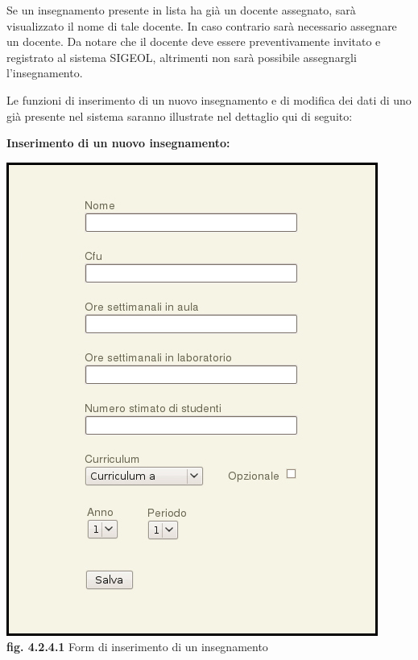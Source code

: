 \documentclass[11pt,a4paper]{article}
\begin{document}
Se un insegnamento presente in lista ha già un docente assegnato, sarà visualizzato il nome di tale docente.
In caso contrario sarà necessario assegnare un docente. Da notare che il docente deve essere preventivamente invitato e registrato al sistema SIGEOL, altrimenti non sarà possibile assegnargli l'insegnamento.

Le funzioni di inserimento di un nuovo insegnamento e di modifica dei dati di uno già presente nel sistema saranno illustrate nel dettaglio qui di seguito:
\newline \newline
\begin{large}\textbf{Inserimento di un nuovo insegnamento:}\end{large}

\bigskip
\begin{center}
	\includegraphics[scale=0.5]{images/nuovo_insegnamento.jpg}\\
	\textbf{fig. 4.2.4.1} Form di inserimento di un insegnamento\\
\end{center}
\bigskip
\end{document}
